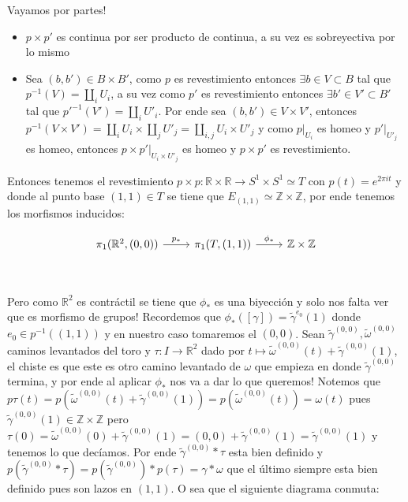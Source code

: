 \documentclass[11pt]{article}
\newcommand{\R}{{\mathbb{R}}}
\newenvironment{proof}[1][Demostraci\'on]{\begin{trivlist}
\item[\hskip \labelsep {\bfseries #1}]}{\end{trivlist}}
\newcommand{\Z}{\mathbb{Z}}
\begin{document}
\begin{enumerate}
\begin{proof}

Vayamos por partes!

\begin{itemize}

\item $p \times p'$ es continua por ser producto de continua, a su vez es sobreyectiva por lo mismo

\item Sea $(b,b') \in B \times B'$, como $p$ es revestimiento entonces $\exists b \in V \subset B$ tal que $p^{-1}(V)=\coprod_{i}{U_i}$,  a su vez como $p'$ es revestimiento entonces $\exists b' \in V' \subset B'$ tal que $p'^{-1}(V')=\coprod_{i}{U'_i}$. Por ende sea $(b,b') \in V \times V'$, entonces $p^{-1}(V \times V') = \coprod_i {U_i} \times \coprod_j {U'_j} = \coprod_{i,j}{U_i \times U'_j}$ y como $p|_{U_i}$ es homeo y $p'|_{U'_j}$ es homeo, entonces $p \times p' |_{U_i \times U'_{j}}$ es homeo y $p \times p'$ es revestimiento.

\end{itemize}

Entonces tenemos el revestimiento $p \times p : \R \times \R \rightarrow S^1 \times S^1 \simeq T$ con $p(t)=e^{2 \pi i t}$ y donde al punto base $(1,1) \in T$ se tiene que $E_{(1,1)} \simeq \Z \times \Z$, por ende tenemos los morfismos inducidos:

\[
\begin{tikzcd}
\pi_1(\R^2,(0,0)) \arrow{r}{p_*} & \pi_1(T,(1,1)) \arrow{r}{\phi_*} & \Z \times \Z \\ \quad 
\end{tikzcd}
\]

Pero como $\R^2$ es contr\'actil se tiene que $\phi_*$ es una biyecci\'on y solo nos falta ver que es morfismo de grupos! Recordemos que $\phi_*([\gamma])=\widetilde{\gamma}^{e_0}(1)$ donde $e_0 \in p^{-1}((1,1))$ y en nuestro caso tomaremos el $(0,0)$. Sean $\widetilde{\gamma}^{(0,0)},\widetilde{\omega}^{(0,0)}$ caminos levantados del toro y $\tau:I \rightarrow \R^2$ dado por $t \mapsto \widetilde{\omega}^{(0,0)}(t) + \widetilde{\gamma}^{(0,0)}(1)$, el chiste es que este es otro camino levantado de $\omega$ que empieza en donde $\widetilde{\gamma}^{(0,0)}$ termina, y por ende al aplicar $\phi_*$ nos va a dar lo que queremos! Notemos que $p\tau (t) = p(\widetilde{\omega}^{(0,0)}(t) + \widetilde{\gamma}^{(0,0)}(1))= p(\widetilde{\omega}^{(0,0)}(t))=\omega(t)$ pues $\widetilde{\gamma}^{(0,0)}(1) \in \Z \times \Z$ pero $\tau(0) = \widetilde{\omega}^{(0,0)}(0) + \widetilde{\gamma}^{(0,0)}(1) = (0,0) + \widetilde{\gamma}^{(0,0)}(1) = \widetilde{\gamma}^{(0,0)}(1)$ y tenemos lo que dec\'iamos. Por ende $\widetilde{\gamma}^{(0,0)}*\tau$ esta bien definido y $p(\widetilde{\gamma}^{(0,0)}*\tau)=p(\widetilde{\gamma}^{(0,0)})*p(\tau)=\gamma*\omega$ que el \'ultimo siempre esta bien definido pues son lazos en $(1,1)$. O sea que el siguiente diagrama conmuta:


\end{proof}
\end{enumerate}
\end{document}
